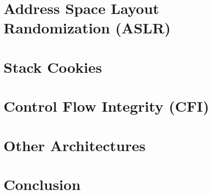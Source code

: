 \documentclass[article]{uibk}
\begin{document}
\section{Address Space Layout Randomization (ASLR)}

\section{Stack Cookies}

\section{Control Flow Integrity (CFI)}

\section{Other Architectures}

\section{Conclusion}


\end{document}
